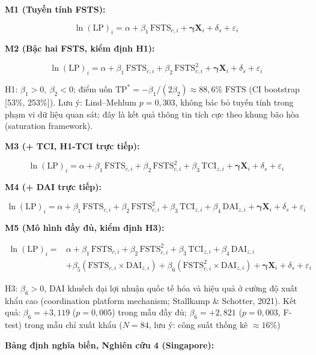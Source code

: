 \documentclass[
  a4paper,
  13pt]{extreport}
\begin{document}
\textbf{M1 (Tuyến tính FSTS):}

\[\ln(\mathrm{LP})_i = \alpha + \beta_1\,\mathrm{FSTS}_{c,i} + \boldsymbol{\gamma}\mathbf{X}_i + \delta_s + \varepsilon_i\]

\textbf{M2 (Bậc hai FSTS, kiểm định H1):}

\[\ln(\mathrm{LP})_i = \alpha + \beta_1\,\mathrm{FSTS}_{c,i} + \beta_2\,\mathrm{FSTS}_{c,i}^{2} + \boldsymbol{\gamma}\mathbf{X}_i + \delta_s + \varepsilon_i\]

H1: \(\beta_1 > 0,\ \beta_2 < 0\); điểm uốn
\(\mathrm{TP}^{*} = -\beta_1/(2\beta_2) \approx 88{,}6\%\)
\(\mathrm{FSTS}\) (CI bootstrap {[}53\%, 253\%{]}). Lưu ý: Lind--Mehlum
\(p = 0{,}303\), không bác bỏ tuyến tính trong phạm vi dữ liệu quan sát;
đây là kết quả thông tin tích cực theo khung bão hòa (saturation
framework).

\textbf{M3 (+ TCI, H1-TCI trực tiếp):}

\[\ln(\mathrm{LP})_i = \alpha + \beta_1\,\mathrm{FSTS}_{c,i} + \beta_2\,\mathrm{FSTS}_{c,i}^{2} + \beta_3\,\mathrm{TCI}_{z,i} + \boldsymbol{\gamma}\mathbf{X}_i + \delta_s + \varepsilon_i\]

\textbf{M4 (+ DAI trực tiếp):}

\[\ln(\mathrm{LP})_i = \alpha + \beta_1\,\mathrm{FSTS}_{c,i} + \beta_2\,\mathrm{FSTS}_{c,i}^{2} + \beta_3\,\mathrm{TCI}_{z,i} + \beta_4\,\mathrm{DAI}_{z,i} + \boldsymbol{\gamma}\mathbf{X}_i + \delta_s + \varepsilon_i\]

\textbf{M5 (Mô hình đầy đủ, kiểm định H3):}

\[\begin{aligned}
\ln(\mathrm{LP})_i = {} & \alpha + \beta_1\,\mathrm{FSTS}_{c,i} + \beta_2\,\mathrm{FSTS}_{c,i}^{2} + \beta_3\,\mathrm{TCI}_{z,i} + \beta_4\,\mathrm{DAI}_{z,i} \\
& + \beta_5(\mathrm{FSTS}_{c,i} \times \mathrm{DAI}_{z,i}) + \beta_6(\mathrm{FSTS}_{c,i}^{2} \times \mathrm{DAI}_{z,i}) + \boldsymbol{\gamma}\mathbf{X}_i + \delta_s + \varepsilon_i
\end{aligned}\]

H3: \(\beta_6 > 0\), DAI khuếch đại lợi nhuận quốc tế hóa và hiệu quả ở
cường độ xuất khẩu cao (coordination platform mechanism; Stallkamp \&
Schotter, 2021). Kết quả: \(\beta_6 = +3{,}119\) (\(p = 0{,}005\)) trong
mẫu đầy đủ; \(\beta_6 = +2{,}821\) (\(p = 0{,}003\), F-test) trong mẫu
chỉ xuất khẩu (\(N = 84\), lưu ý: công suất thống kê \(\approx 16\%\))

\textbf{Bảng định nghĩa biến, Nghiên cứu 4 (Singapore):}
\end{document}
